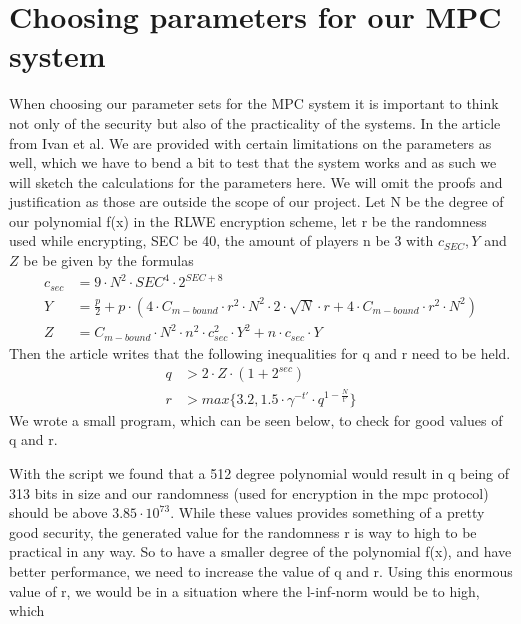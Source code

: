 \documentclass[../main.tex]{subfiles}
\begin{document}
\section{Choosing parameters for our MPC system}
    When choosing our parameter sets for the MPC system it is important to think not only of the security but also of
    the practicality of the systems.
    In the article \cite{damgaard2012multiparty} from Ivan et al.
	We are provided with certain limitations on the parameters as well, which we have to bend a bit to test that the system works and as such we will sketch the calculations for the parameters here.
    We will omit the proofs and justification as those are outside the scope of our project.
    Let N be the degree of our polynomial f(x) in the RLWE encryption scheme, %
    let r be the randomness used while encrypting, SEC be 40, the amount of players n be 3 with $c_{SEC}, Y$ and $Z$ be
    be given by the formulas
    \begin{align*}
        c_{sec} &= 9 \cdot N^2 \cdot SEC^4 \cdot 2^{SEC + 8} \\
        Y       &= \frac{p}{2} + p \cdot (4 \cdot C_{m-bound} \cdot r^2 \cdot N^2 \cdot 2 \cdot \sqrt{N} \cdot r + 4 \cdot C_{m-bound} \cdot r^2 \cdot N^2) \\
        Z       &= C_{m-bound} \cdot N^2 \cdot n^2 \cdot c_{sec}^2 \cdot Y^2 + n \cdot c_{sec} \cdot Y
    \end{align*}
    Then the article writes that the following inequalities for q and r need to be held.
    \begin{align*}
        q   &> 2 \cdot Z \cdot (1 + 2^{sec}) \\
        r   &> max\{3.2, 1.5 \cdot \gamma^{-t'} \cdot q^{1 - \frac{N}{t'}}\}
    \end{align*}
    We wrote a small program, which can be seen below, to check for good values of q and r.
    
	With the script we found that a  512 degree polynomial would result in q being of 313 bits in size and our randomness (used for encryption in the mpc protocol) should be above $3.85 \cdot 10^{73}$.
	While these values provides something of a pretty good security, the generated value for the randomness r is way to high to be
	practical in any way.
	So to have a smaller degree of the polynomial f(x), and have better performance,
	we need to increase the value of q and r.
	Using this enormous value of r, we would be in a situation where the l-inf-norm would be to high, which
\end{document}

